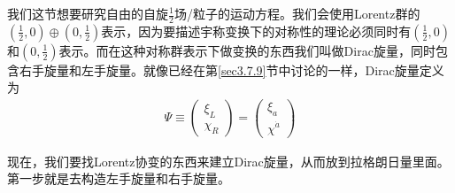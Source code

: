 我们这节想要研究自由的自旋$\frac{1}{2}$场/粒子的运动方程。我们会使用Lorentz群的$(\frac{1}{2},0)\oplus(0,\frac{1}{2})$表示，因为要描述宇称变换下的对称性的理论必须同时有$(\frac{1}{2},0)$和$(0,\frac{1}{2})$表示。而在这种对称群表示下做变换的东西我们叫做Dirac旋量，同时包含右手旋量和左手旋量。就像已经在第\ref{sec3.7.9}节中讨论的一样，Dirac旋量定义为
\begin{align}
\Psi\equiv\left(\begin{matrix}\xi_L\\ \chi_R\end{matrix}\right)=\left(\begin{matrix}\xi_a\\ \chi^{\dot{a}}\end{matrix}\right)
\end{align}

现在，我们要找Lorentz协变的东西来建立Dirac旋量，从而放到拉格朗日量里面。第一步就是去构造左手旋量和右手旋量。

